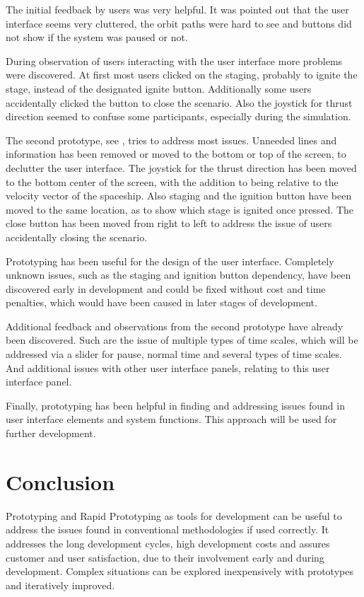 \documentclass[runningheads]{llncs}
\begin{document}
The initial feedback by users was very helpful. It was pointed out that the user interface seems very cluttered, the orbit paths 
were hard to see and buttons did not show if the system was paused or not.

During observation of users interacting with the user interface more problems were discovered. At first most users clicked on the
staging, probably to ignite the stage, instead of the designated ignite button. Additionally some users accidentally clicked the
button to close the scenario. Also the joystick for thrust direction seemed to confuse some participants, especially during the simulation.

The second prototype, see , tries to address most issues. Unneeded lines and information has been removed or moved to the bottom 
or top of the screen, to declutter the user interface. The joystick for the thrust direction has been moved to the bottom center of the screen, with 
the addition to being relative to the velocity vector of the spaceship. Also staging and the ignition button have been moved to the 
same location, as to show which stage is ignited once pressed. The close button has been moved from right to left to address the issue of users accidentally closing the scenario.

Prototyping has been useful for the design of the user interface. Completely unknown issues, such as the staging and ignition button dependency,
have been discovered early in development and could be fixed without cost and time penalties, which would have been caused in later stages of development.

Additional feedback and observations from the second prototype have already been discovered. Such are the issue of multiple types of time scales, which
will be addressed via a slider for pause, normal time and several types of time scales. And additional issues with other user interface panels, relating
to this user interface panel.

Finally, prototyping has been helpful in finding and addressing issues found in user interface elements and system functions. This approach
will be used for further development.

\section{Conclusion}
Prototyping and Rapid Prototyping as tools for development can be useful to address the issues found in conventional methodologies if used correctly. 
It addresses the long development cycles, high development costs and assures customer and user satisfaction, due to their involvement
early and during development. Complex situations can be explored inexpensively with prototypes and iteratively improved.
\end{document}

